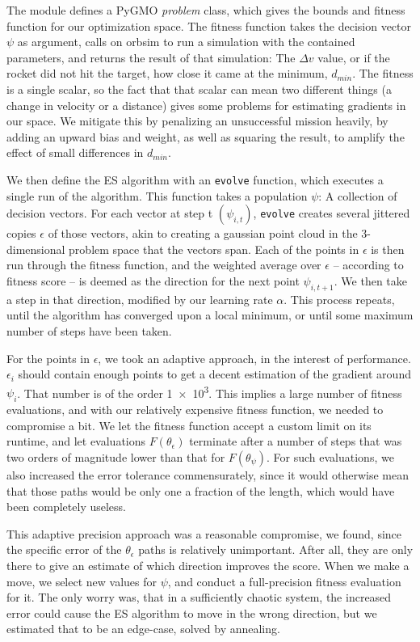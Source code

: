 The module defines a PyGMO \emph{problem} class, which gives the bounds and fitness function for our optimization space. The fitness function takes the decision vector \(\psi\) as argument, calls on orbsim to run a simulation with the contained parameters, and returns the result of that simulation: The \(\Delta v\) value, or if the rocket did not hit the target, how close it came at the minimum, \(d_{min}\). The fitness is a single scalar, so the fact that that scalar can mean two different things (a change in velocity or a distance) gives some problems for estimating gradients in our space. We mitigate this by penalizing an unsuccessful mission heavily, by adding an upward bias and weight, as well as squaring the result, to amplify the effect of small differences in \(d_{min}\).

We then define the ES algorithm with an \texttt{evolve} function, which executes a single run of the algorithm. This function takes a population \(\psi\): A collection of decision vectors. For each vector at step t \((\psi_{i,t})\), \texttt{evolve} creates several jittered copies \(\epsilon\) of those vectors, akin to creating a gaussian point cloud in the 3-dimensional problem space that the vectors span. Each of the points in \(\epsilon\) is then run through the fitness function, and the weighted average over \(\epsilon\) -- according to fitness score -- is deemed as the direction for the next point \(\psi_{i,t+1}\). We then take a step in that direction, modified by our learning rate \(\alpha\). This process repeats, until the algorithm has converged upon a local minimum, or until some maximum number of steps have been taken.

For the points in \(\epsilon\), we took an adaptive approach, in the interest of performance. \(\epsilon_i\) should contain enough points to get a decent estimation of the gradient around \(\psi_i\). That number is of the order \num{1e3}. This implies a large number of fitness evaluations, and with our relatively expensive fitness function, we needed to compromise a bit. We let the fitness function accept a custom limit on its runtime, and let evaluations \(F(\theta_\epsilon)\) terminate after a number of steps that was two orders of magnitude lower than that for \(F(\theta_\psi)\). For such evaluations, we also increased the error tolerance commensurately, since it would otherwise mean that those paths would be only one a fraction of  the length, which would have been completely useless.

This adaptive precision approach was a reasonable compromise, we found, since the specific error of the \(\theta_\epsilon\) paths is relatively unimportant. After all, they are only there to give an estimate of which direction improves the score. When we make a move, we select new values for \(\psi\), and conduct a full-precision fitness evaluation for it. The only worry was, that in a sufficiently chaotic system, the increased error could cause the ES algorithm to move in the wrong direction, but we estimated that to be an edge-case, solved by annealing.


